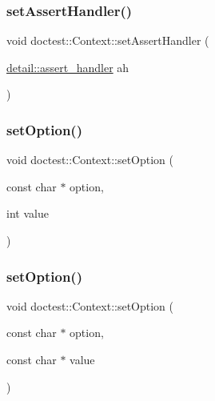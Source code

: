 \mbox{\label{classdoctest_1_1Context_a669dd0a596a611eeb0decdb78b661a90}} 
\subsubsection{\texorpdfstring{set\+Assert\+Handler()}{setAssertHandler()}}
{\footnotesize\ttfamily void doctest\+::\+Context\+::set\+Assert\+Handler (\begin{DoxyParamCaption}\item[{\hyperlink{namespacedoctest_1_1detail_a5b5db6997f20389de5735e3ee3439b95}{detail\+::assert\+\_\+handler}}]{ah }\end{DoxyParamCaption})}

\mbox{\label{classdoctest_1_1Context_a95e7a0230c5897f0eae36718f51d2f05}} 
\subsubsection{\texorpdfstring{set\+Option()}{setOption()}\hspace{0.1cm}{\footnotesize\ttfamily [1/2]}}
{\footnotesize\ttfamily void doctest\+::\+Context\+::set\+Option (\begin{DoxyParamCaption}\item[{const char $\ast$}]{option,  }\item[{int}]{value }\end{DoxyParamCaption})}

\mbox{\label{classdoctest_1_1Context_a4352ffc196c4ba56045270e45baa2754}} 
\subsubsection{\texorpdfstring{set\+Option()}{setOption()}\hspace{0.1cm}{\footnotesize\ttfamily [2/2]}}
{\footnotesize\ttfamily void doctest\+::\+Context\+::set\+Option (\begin{DoxyParamCaption}\item[{const char $\ast$}]{option,  }\item[{const char $\ast$}]{value }\end{DoxyParamCaption})}

